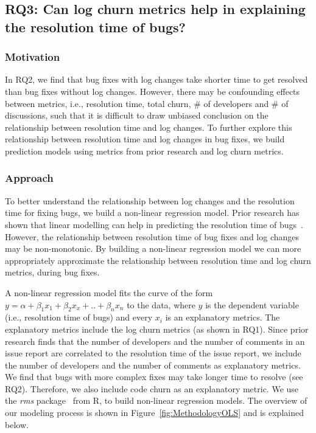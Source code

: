 \subsection*{RQ3: Can log churn metrics help in explaining the resolution time of bugs?} 

\subsubsection*{Motivation}

In RQ2, we find that bug fixes with log changes take shorter time to get resolved than bug fixes without log changes. However, there may be confounding effects between metrics, i.e., resolution time, total churn, \# of developers and \# of discussions, such that it is difficult to draw unbiased conclusion on the relationship between resolution time and log changes. To further explore this relationship between resolution time and log changes in bug fixes, we build prediction models using metrics from prior research and log churn metrics. %

\subsubsection*{Approach}

To better understand the relationship between log changes and the resolution time for fixing bugs, we build a non-linear regression model. Prior research has shown that linear modelling can help in predicting the resolution time of bugs~\cite{anbalagan2009predicting}. However, the relationship between resolution time of bug fixes and log changes may be non-monotonic. By building a non-linear regression model we can more appropriately approximate the relationship between resolution time and log churn metrics, during bug fixes.

A non-linear regression model fits the curve of the form $y = \alpha + \beta_{1}x_{1} + \beta_{2}x_{x} + .. + \beta_{n}x_{n} $ to the data, where $y$ is the dependent variable (i.e., resolution time of bugs) and every $x_{i}$ is an explanatory metrics. The explanatory metrics include the log churn metrics (as shown in RQ1). Since prior research finds that the number of developers and the number of comments in an issue report are correlated to the resolution time of the issue report, we include the number of developers and the number of comments as explanatory metrics. We find that bugs with more complex fixes may take longer time to resolve (see RQ2). Therefore, we also include code churn as an explanatory metric. We use the \textsl{rms} package~\cite{rmsPackage} from R, to build non-linear regression models. The overview of our modeling process is shown in Figure~\ref{fig:MethodologyOLS} and is explained below. 




